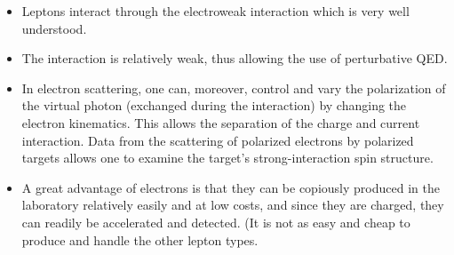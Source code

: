 \begin{itemize} 
\item Leptons %
interact through the electroweak interaction which is very well understood. %
\item The interaction is relatively weak, thus %
allowing the use of perturbative QED.
\item In electron scattering, one can, moreover, control and vary the polarization of the virtual photon (exchanged during the interaction) by changing the electron kinematics. This allows the separation of the charge and current interaction. %
Data from the scattering of polarized electrons by polarized targets allows one to examine the target's strong-interaction spin structure.
\item A %
great advantage of electrons is that they can be copiously produced in the laboratory relatively easily and at low costs, and since they are charged, they can readily be accelerated and detected. (It is not as easy and cheap to produce and handle 
the other lepton types.

\end{itemize}
